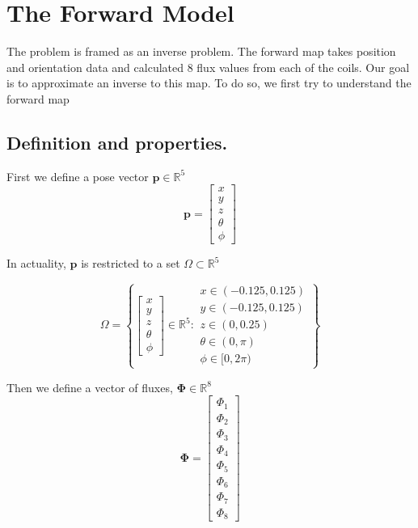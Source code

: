 \documentclass[12pt,a4paper]{report}
\begin{document}
\section{The Forward Model}
The problem is framed as an inverse problem. The forward map takes position and orientation data and calculated 8 flux values from each of the coils. Our goal is to approximate an inverse to this map. To do so, we first try to understand the forward map 
\subsection{Definition and properties.}
First we define a pose vector $\mathbf{p} \in \mathbb{R}^5$ \\
\begin{equation}
  \mathbf{p} = 
  \begin{bmatrix}
    x \\ y \\ z \\ \theta \\ \phi 
  \end{bmatrix}
\end{equation}

In actuality, $\mathbf{p}$ is restricted to a set $\Omega \subset \mathbb{R}^5$

\begin{equation}
  \Omega = \left\{
  \begin{bmatrix} x \\ y \\ z \\ \theta \\ \phi \end{bmatrix} \in \mathbb{R}^5 : 
  \begin{matrix} x \in (-0.125,0.125) \\ y \in (-0.125,0.125) \\ z \in (0,0.25) \\ \theta \in (0,\pi) \\ \phi \in [0,2\pi) \end{matrix}
  \right\}
\end{equation}

Then we define a vector of fluxes, $\mathbf{\Phi} \in \mathbb{R}^8$
\begin{equation}
  \mathbf{\Phi} = 
  \begin{bmatrix}
    \Phi_1 \\ \Phi_2 \\ \Phi_3 \\ \Phi_4 \\ \Phi_5 \\ \Phi_6 \\ \Phi_7 \\ \Phi_8 
  \end{bmatrix}
\end{equation}
\end{document}
